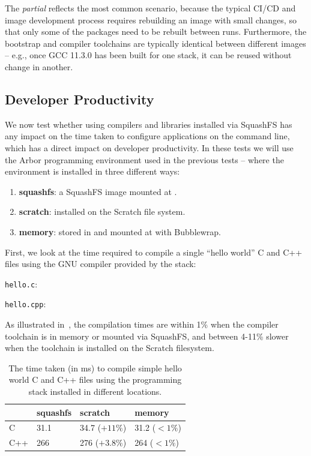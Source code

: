 The \emph{partial} reflects the most common scenario, because the typical CI/CD and image development process requires rebuilding an image with small changes, so that only some of the packages need to be rebuilt between runs.
Furthermore, the bootstrap and compiler toolchains are typically identical between different images -- e.g., once GCC 11.3.0 has been built for one stack, it can be reused without change in another.

\subsection{Developer Productivity}

We now test whether using compilers and libraries installed via SquashFS has any impact on the time taken to configure applications on the command line, which has a direct impact on developer productivity.
In these tests we will use the Arbor programming environment used in the previous tests -- where the environment is installed in three different ways:
\begin{enumerate}
    \item \textbf{squashfs}: a SquashFS image mounted at .
    \item \textbf{scratch}: installed on the Scratch file system.
    \item \textbf{memory}: stored in  and mounted at  with Bubblewrap.
\end{enumerate}

First, we look at the time required to compile a single ``hello world'' C and C++ files using the GNU compiler provided by the stack:

\noindent\texttt{hello.c}:

\noindent\texttt{hello.cpp}:


As illustrated in~, the compilation times are within 1\% when the compiler toolchain is in memory or mounted via SquashFS, and between 4-11\% slower when the toolchain is installed on the Scratch filesystem.
\begin{table}[htp!]
    \begin{center}
        \begin{tabular}{l | l l l}
                & squashfs & scratch & memory \\
                \hline
            C   &  31.1 &  34.7 ($+ 11\%$) &  31.2 ($ < 1 \%$) \\
            C++ & 266   & 276   ($+3.8\%$) & 264   ($ < 1 \%$) \\
        \end{tabular}
    \end{center}
    \caption{The time taken (in ms) to compile simple hello world C and C++ files using the programming stack installed in different locations.}
    \label{tbl:hello-world-compile}
\end{table}
    
